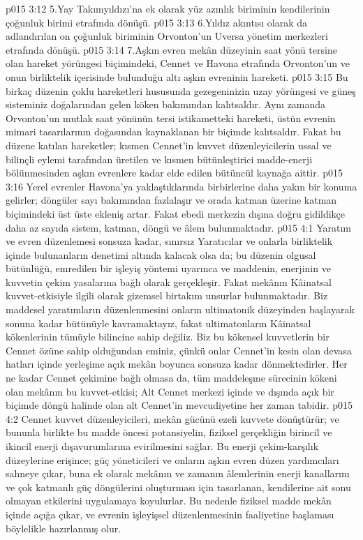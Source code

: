 \vs p015 3:12 5.\bibnobreakspace Yay Takımyıldızı’na ek olarak yüz azınlık biriminin kendilerinin çoğunluk birimi etrafında dönüşü.
\vs p015 3:13 6.\bibnobreakspace Yıldız akıntısı olarak da adlandırılan on çoğunluk biriminin Orvonton’un Uversa yönetim merkezleri etrafında dönüşü.
\vs p015 3:14 7.\bibnobreakspace Aşkın evren mekân düzeyinin saat yönü tersine olan hareket yörüngesi biçimindeki, Cennet ve Havona etrafında Orvonton’un ve onun birliktelik içerisinde bulunduğu altı aşkın evreninin hareketi.
\vs p015 3:15 Bu birkaç düzenin çoklu hareketleri hususunda gezegeninizin uzay yörüngesi ve güneş sisteminiz doğalarından gelen köken bakımından kalıtsaldır. Aynı zamanda Orvonton’un mutlak saat yönünün tersi istikametteki hareketi, üstün evrenin mimari tasarılarının doğasından kaynaklanan bir biçimde kalıtsaldır. Fakat bu düzene katılan hareketler; kısmen Cennet’in kuvvet düzenleyicilerin ussal ve bilinçli eylemi tarafından üretilen ve kısmen bütünleştirici madde\hyp{}enerji bölünmesinden aşkın evrenlere kadar elde edilen bütüncül kaynağa aittir.
\vs p015 3:16 Yerel evrenler Havona’ya yaklaştıklarında birbirlerine daha yakın bir konuma gelirler; döngüler sayı bakımından fazlalaşır ve orada katman üzerine katman biçimindeki üst üste ekleniş artar. Fakat ebedi merkezin dışına doğru gidildikçe daha az sayıda sistem, katman, döngü ve âlem bulunmaktadır.
\vs p015 4:1 Yaratım ve evren düzenlemesi sonsuza kadar, sınırsız Yaratıcılar ve onlarla birliktelik içinde bulunanların denetimi altında kalacak olsa da; bu düzenin olgusal bütünlüğü, emredilen bir işleyiş yöntemi uyarınca ve maddenin, enerjinin ve kuvvetin çekim yasalarına bağlı olarak gerçekleşir. Fakat mekânın Kâinatsal kuvvet\hyp{}etkisiyle ilgili olarak gizemsel birtakım unsurlar bulunmaktadır. Biz maddesel yaratımların düzenlenmesini onların ultimatonik düzeyinden başlayarak sonuna kadar bütünüyle kavramaktayız, fakat ultimatonların Kâinatsal kökenlerinin tümüyle bilincine sahip değiliz. Biz bu kökensel kuvvetlerin bir Cennet özüne sahip olduğundan eminiz, çünkü onlar Cennet’in kesin olan devasa hatları içinde yerleşime açık mekân boyunca sonsuza kadar dönmektedirler. Her ne kadar Cennet çekimine bağlı olmasa da, tüm maddeleşme sürecinin kökeni olan mekânın bu kuvvet\hyp{}etkisi; Alt Cennet merkezi içinde ve dışında açık bir biçimde döngü halinde olan alt Cennet’in mevcudiyetine her zaman tabidir.
\vs p015 4:2 Cennet kuvvet düzenleyicileri, mekân gücünü ezeli kuvvete dönüştürür; ve bununla birlikte bu madde öncesi potansiyelin, fiziksel gerçekliğin birincil ve ikincil enerji dışavurumlarına evirilmesini sağlar. Bu enerji çekim\hyp{}karşılık düzeylerine erişince; güç yöneticileri ve onların aşkın evren düzen yardımcıları sahneye çıkar, buna ek olarak mekânın ve zamanın âlemlerinin enerji kanallarını ve çok katmanlı güç döngülerini oluşturması için tasarlanan, kendilerine ait sonu olmayan etkilerini uygulamaya koyulurlar. Bu nedenle fiziksel madde mekân içinde açığa çıkar, ve evrenin işleyişsel düzenlenmesinin faaliyetine başlaması böylelikle hazırlanmış olur.
